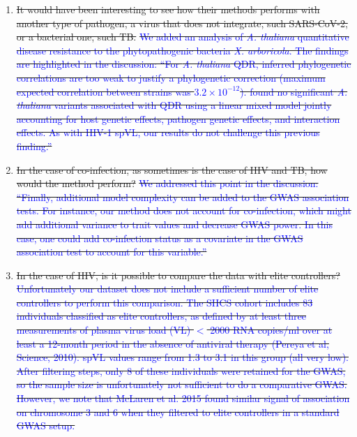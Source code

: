 \documentclass[12pt]{article} %
\providecommand{\DIFdel}[1]{{\protect\color{red}\sout{#1}}}                      %
\begin{document}
\begin{enumerate}%
\item%
\DIFdel{It would have been interesting to see how their methods performs with another type of pathogen, a virus that does not integrate, such SARS-CoV-2, or a bacterial one, such TB. }%
\DIFdel{\textcolor{blue}{We added an analysis of \emph{A. thaliana} quantitative disease resistance to the phytopathogenic bacteria \emph{X. arboricola}. The findings are highlighted in the discussion: ``For \emph{A. thaliana} QDR, inferred phylogenetic correlations are too weak to justify a phylogenetic correction (maximum expected correlation between strains was $3.2 \times 10^{-12}$). \cite{Wang2018Two-wayGenomes} found no significant \emph{A. thaliana} variants associated with QDR using a linear mixed model jointly accounting for host genetic effects, pathogen genetic effects, and interaction effects. As with HIV-1 spVL, our results do not challenge this previous finding.''}
    }%
\item%
\DIFdel{In the case of co-infection, as sometimes is the case of HIV and TB, how would the method perform? }%
\DIFdel{\textcolor{blue}{We addressed this point in the discussion: ``Finally, additional model complexity can be added to the GWAS association tests. For instance, our method does not account for co-infection, which might add additional variance to trait values and decrease GWAS power. In this case, one could add co-infection status as a covariate in the GWAS association test to account for this variable.''}
    }%
\item%
\DIFdel{In the case of HIV, is it possible to compare the data with elite controllers? }%
\DIFdel{\textcolor{blue}{Unfortunately our dataset does not include a sufficient number of elite controllers to perform this comparison. The SHCS cohort includes 83 individuals classified as elite controllers, as defined by at least three measurements of plasma virus load (VL) $<$ 2000 RNA copies/ml over at least a 12-month period in the absence of antiviral therapy (Pereya et al, Science, 2010). spVL values range from 1.3 to 3.1 in this group (all very low). After filtering steps, only 8 of these individuals were retained for the GWAS, so the sample size is unfortunately not sufficient to do a comparative GWAS. However, we note that McLaren et al. 2015 found similar signal of association on chromosome 3 and 6 when they filtered to elite controllers in a standard GWAS setup.}
}
\end{enumerate}
\end{document}
